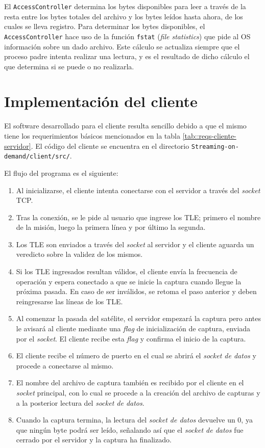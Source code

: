 \documentclass[../../main.tex]{subfiles}
\begin{document}
El \texttt{AccessController} determina los bytes disponibles para leer a través de la resta entre los bytes totales del archivo y los bytes leídos hasta ahora, de los cuales se lleva registro. Para determinar los bytes disponibles, el \texttt{AccessController} hace uso de la función \texttt{fstat}  (\textit{file statistics}) que pide al OS información sobre un dado archivo. Este cálculo se actualiza siempre que el proceso padre intenta realizar una lectura, y es el resultado de dicho cálculo el que determina si se puede o no realizarla.

\section{Implementación del cliente}\label{sec::implementacion-cliente}
El software desarrollado para el cliente resulta sencillo debido a que el mismo tiene los requerimientos básicos mencionados en la tabla \ref{tab::reqs-cliente-servidor}. El código del cliente se encuentra en el directorio \texttt{Streaming-on-demand/client/src/}.

El flujo del programa es el siguiente:
\begin{enumerate}
    \item Al inicializarse, el cliente intenta conectarse con el servidor a través del \textit{socket} TCP.
    \item Tras la conexión, se le pide al usuario que ingrese los TLE; primero el nombre de la misión, luego la primera línea y por último la segunda.
    \item Los TLE son enviados a través del \textit{socket} al servidor y el cliente aguarda un veredicto sobre la validez de los mismos.
    \item Si los TLE ingresados resultan válidos, el cliente envía la frecuencia de operación y espera conectado a que se inicie la captura cuando llegue la próxima pasada. En caso de ser inválidos, se retoma el paso anterior y deben reingresarse las líneas de los TLE.
    \item Al comenzar la pasada del satélite, el servidor empezará la captura pero antes le avisará al cliente mediante una \textit{flag} de inicialización de captura, enviada por el \textit{socket}. El cliente recibe esta \textit{flag} y confirma el inicio de la captura.
    \item El cliente recibe el número de puerto en el cual se abrirá el \textit{socket de datos} y procede a conectarse al mismo.
    \item El nombre del archivo de captura también es recibido por el cliente en el \textit{socket} principal, con lo cual se procede a la creación del archivo de capturas y a la posterior lectura del \textit{socket de datos}.
    \item Cuando la captura termina, la lectura del \textit{socket de datos} devuelve un 0, ya que ningún byte podrá ser leído, señalando así que el \textit{socket de datos} fue cerrado por el servidor y la captura ha finalizado.
\end{enumerate}
\end{document}
